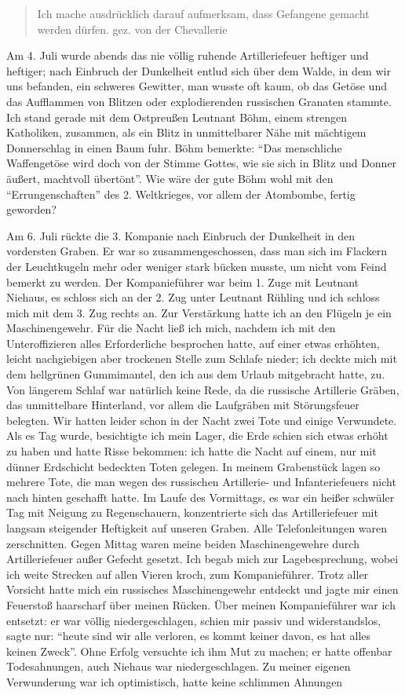 \begin{quote}
Ich mache ausdrücklich darauf aufmerksam, dass Gefangene gemacht werden dürfen.
\raggedleft gez. von der Chevallerie
\end{quote}

Am 4. Juli wurde abends das nie völlig ruhende Artilleriefeuer heftiger und heftiger; nach Einbruch der Dunkelheit entlud sich über dem Walde, in dem wir uns befanden, ein schweres Gewitter, man wusste oft kaum, ob das Getöse und das Aufflammen von Blitzen oder explodierenden russischen Granaten stammte. Ich stand gerade mit dem Ostpreußen Leutnant Böhm, einem strengen Katholiken, zusammen, als ein Blitz in unmittelbarer Nähe mit mächtigem Donnerschlag in einen Baum fuhr. Böhm bemerkte: \enquote{Das menschliche Waffengetöse wird doch von der Stimme Gottes, wie sie sich in Blitz und Donner äußert, machtvoll übertönt}. Wie wäre der gute Böhm wohl mit den \enquote{Errungenschaften} des 2. Weltkrieges, vor allem der Atombombe, fertig geworden?

Am 6. Juli rückte die 3. Kompanie nach Einbruch der Dunkelheit in den vordersten Graben. Er war so zusammengeschossen, dass man sich im Flackern der Leuchtkugeln mehr oder weniger stark bücken musste, um nicht vom Feind bemerkt zu werden. Der Kompanieführer war beim 1. Zuge mit Leutnant Niehaus, es schloss sich an der 2. Zug unter Leutnant Rühling und ich schloss mich mit dem 3. Zug rechts an. Zur Verstärkung hatte ich an den Flügeln je ein Maschinengewehr. Für die Nacht ließ ich mich, nachdem ich mit den Unteroffizieren alles Erforderliche besprochen hatte, auf einer etwas erhöhten, leicht nachgiebigen aber trockenen Stelle zum Schlafe nieder; ich deckte mich mit dem hellgrünen Gummimantel, den ich aus dem Urlaub mitgebracht hatte, zu. Von längerem Schlaf war natürlich keine Rede, da die russische Artillerie Gräben, das unmittelbare Hinterland, vor allem die Laufgräben mit Störungsfeuer belegten. Wir hatten leider schon in der Nacht zwei Tote und einige Verwundete. Als es Tag wurde, besichtigte ich mein Lager, die Erde schien sich etwas erhöht zu haben und hatte Risse bekommen: ich hatte die Nacht auf einem, nur mit dünner Erdschicht bedeckten Toten gelegen. In meinem Grabenstück lagen so mehrere Tote, die man wegen des russischen Artillerie- und Infanteriefeuers nicht nach hinten geschafft hatte. Im Laufe des Vormittags, es war ein heißer schwüler Tag mit Neigung zu Regenschauern, konzentrierte sich das Artilleriefeuer mit langsam steigender Heftigkeit auf unseren Graben. Alle Telefonleitungen waren zerschnitten. Gegen Mittag waren meine beiden Maschinengewehre durch Artilleriefeuer außer Gefecht gesetzt. Ich begab mich zur Lagebesprechung, wobei ich weite Strecken auf allen Vieren kroch, zum Kompanieführer. Trotz aller Vorsicht hatte mich ein russisches Maschinengewehr entdeckt und jagte mir einen Feuerstoß haarscharf über meinen Rücken. Über meinen Kompanieführer war ich entsetzt: er war völlig niedergeschlagen, schien mir passiv und widerstandslos, sagte nur: \enquote{heute sind wir alle verloren, es kommt keiner davon, es hat alles keinen Zweck}. Ohne Erfolg versuchte ich ihm Mut zu machen; er hatte offenbar Todesahnungen, auch Niehaus war niedergeschlagen. Zu meiner eigenen Verwunderung war ich optimistisch, hatte keine schlimmen Ahnungen

